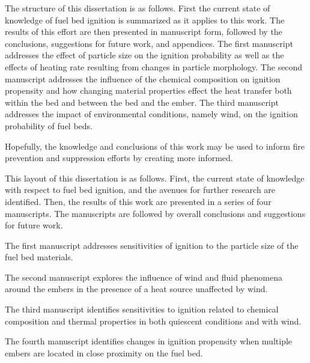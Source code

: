     The structure of this dissertation is as follows. First the current state of knowledge of fuel bed ignition is summarized as it applies to this work. The results of this effort are then presented in manuscript form, followed by the conclusions, suggestions for future work, and appendices. 
    The first manuscript addresses the effect of particle size on the ignition probability as well as the effects of heating rate resulting from changes in particle morphology. The second manuscript addresses the influence of the chemical composition on ignition propensity and how changing material properties effect the heat transfer both within the bed and between the bed and the ember. The third manuscript addresses the impact of environmental conditions, namely wind, on the ignition probability of fuel beds.
    
    Hopefully, the knowledge and conclusions of this work may be used to inform fire prevention and suppression efforts by creating more informed.
    
    This layout of this dissertation is as follows. First, the current state of knowledge with respect to fuel bed ignition, and the avenues for further research are identified. Then, the results of this work are presented in a series of four manuscripts. The manuscripts are followed by overall conclusions and suggestions for future work.
    
    The first manuscript addresses sensitivities of ignition to the particle size of the fuel bed materials. 
    
    The second manuscript explores the influence of wind and fluid phenomena around the embers in the presence of a heat source unaffected by wind.
    
    The third manuscript identifies sensitivities to ignition related to chemical composition and thermal properties in both quiescent conditions and with wind. 
    
    The fourth manuscript identifies changes in ignition propensity when multiple embers are located in close proximity on the fuel bed.